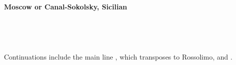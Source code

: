 \begin{center}\textbf{Moscow or Canal-Sokolsky, Sicilian}\\\end{center}
\newgame
{}\\
\notationoff
\begin{center}\showboard\\\end{center}
Continuations include the main line ,  which transposes to Rossolimo, and .
